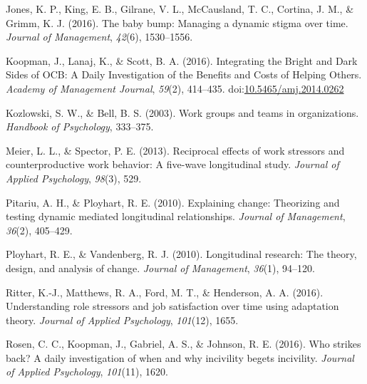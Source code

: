 \documentclass[english,,man]{apa6}
\theoremstyle{definition}
\theoremstyle{definition}
\theoremstyle{definition}
\theoremstyle{remark}
\begin{document}
\leavevmode\hypertarget{ref-jones_baby_2016}{}%
Jones, K. P., King, E. B., Gilrane, V. L., McCausland, T. C., Cortina,
J. M., \& Grimm, K. J. (2016). The baby bump: Managing a dynamic stigma
over time. \emph{Journal of Management}, \emph{42}(6), 1530--1556.

\leavevmode\hypertarget{ref-koopman_integrating_2016}{}%
Koopman, J., Lanaj, K., \& Scott, B. A. (2016). Integrating the Bright
and Dark Sides of OCB: A Daily Investigation of the Benefits and Costs
of Helping Others. \emph{Academy of Management Journal}, \emph{59}(2),
414--435.
doi:\href{https://doi.org/10.5465/amj.2014.0262}{10.5465/amj.2014.0262}

\leavevmode\hypertarget{ref-kozlowski_work_2003}{}%
Kozlowski, S. W., \& Bell, B. S. (2003). Work groups and teams in
organizations. \emph{Handbook of Psychology}, 333--375.

\leavevmode\hypertarget{ref-meier_reciprocal_2013}{}%
Meier, L. L., \& Spector, P. E. (2013). Reciprocal effects of work
stressors and counterproductive work behavior: A five-wave longitudinal
study. \emph{Journal of Applied Psychology}, \emph{98}(3), 529.

\leavevmode\hypertarget{ref-pitariu_explaining_2010}{}%
Pitariu, A. H., \& Ployhart, R. E. (2010). Explaining change: Theorizing
and testing dynamic mediated longitudinal relationships. \emph{Journal
of Management}, \emph{36}(2), 405--429.

\leavevmode\hypertarget{ref-ployhart_longitudinal_2010}{}%
Ployhart, R. E., \& Vandenberg, R. J. (2010). Longitudinal research: The
theory, design, and analysis of change. \emph{Journal of Management},
\emph{36}(1), 94--120.

\leavevmode\hypertarget{ref-ritter_understanding_2016}{}%
Ritter, K.-J., Matthews, R. A., Ford, M. T., \& Henderson, A. A. (2016).
Understanding role stressors and job satisfaction over time using
adaptation theory. \emph{Journal of Applied Psychology}, \emph{101}(12),
1655.

\leavevmode\hypertarget{ref-rosen_who_2016}{}%
Rosen, C. C., Koopman, J., Gabriel, A. S., \& Johnson, R. E. (2016). Who
strikes back? A daily investigation of when and why incivility begets
incivility. \emph{Journal of Applied Psychology}, \emph{101}(11), 1620.
\end{document}
